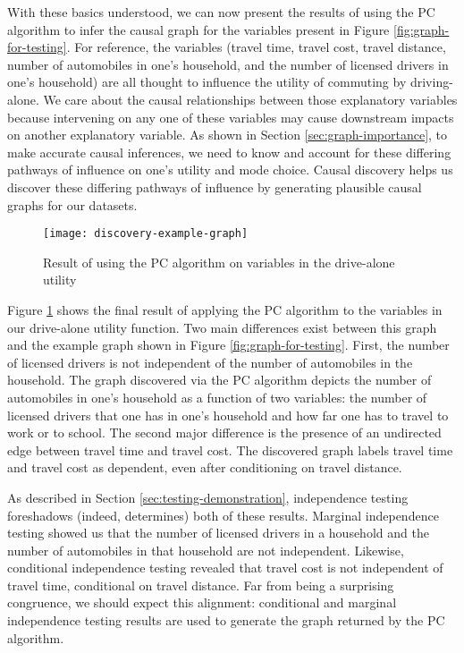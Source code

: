 With these basics understood, we can now present the results of using the PC algorithm to infer the causal graph for the variables present in Figure \ref{fig:graph-for-testing}.
For reference, the variables (travel time, travel cost, travel distance, number of automobiles in one's household, and the number of licensed drivers in one's household) are all thought to influence the utility of commuting by driving-alone.
We care about the causal relationships between those explanatory variables because intervening on any one of these variables may cause downstream impacts on another explanatory variable.
As shown in Section \ref{sec:graph-importance}, to make accurate causal inferences, we need to know and account for these differing pathways of influence on one's utility and mode choice.
Causal discovery helps us discover these differing pathways of influence by generating plausible causal graphs for our datasets.

\begin{figure}
   \centering
   \texttt{[image: discovery-example-graph]}
   \caption{Result of using the PC algorithm on variables in the drive-alone utility}
   \label{fig:discovery-example-graph}
\end{figure}

Figure \ref{fig:discovery-example-graph} shows the final result of applying the PC algorithm to the variables in our drive-alone utility function.
Two main differences exist between this graph and the example graph shown in Figure \ref{fig:graph-for-testing}.
First, the number of licensed drivers is not independent of the number of automobiles in the household.
The graph discovered via the PC algorithm depicts the number of automobiles in one's household as a function of two variables: the number of licensed drivers that one has in one's household and how far one has to travel to work or to school.
The second major difference is the presence of an undirected edge between travel time and travel cost.
The discovered graph labels travel time and travel cost as dependent, even after conditioning on travel distance.

As described in Section \ref{sec:testing-demonstration}, independence testing foreshadows (indeed, determines) both of these results.
Marginal independence testing showed us that the number of licensed drivers in a household and the number of automobiles in that household are not independent.
Likewise, conditional independence testing revealed that travel cost is not independent of travel time, conditional on travel distance.
Far from being a surprising congruence, we should expect this alignment: conditional and marginal independence testing results are used to generate the graph returned by the PC algorithm.

